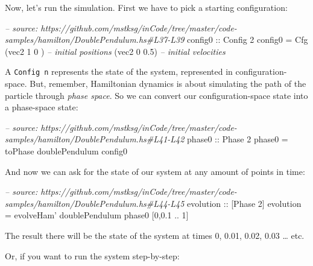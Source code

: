 \documentclass[]{article}
\newenvironment{Shaded}{}{}
\newcommand{\CommentTok}[1]{\textcolor[rgb]{0.38,0.63,0.69}{\textit{#1}}}
\newcommand{\DataTypeTok}[1]{\textcolor[rgb]{0.56,0.13,0.00}{#1}}
\newcommand{\DecValTok}[1]{\textcolor[rgb]{0.25,0.63,0.44}{#1}}
\newcommand{\FloatTok}[1]{\textcolor[rgb]{0.25,0.63,0.44}{#1}}
\newcommand{\FunctionTok}[1]{\textcolor[rgb]{0.02,0.16,0.49}{#1}}
\newcommand{\NormalTok}[1]{#1}
\newcommand{\OtherTok}[1]{\textcolor[rgb]{0.00,0.44,0.13}{#1}}
\begin{document}
Now, let's run the simulation. First we have to pick a starting configuration:

\begin{Shaded}
\begin{Highlighting}[]
\CommentTok{-- source: https://github.com/mstksg/inCode/tree/master/code-samples/hamilton/DoublePendulum.hs#L37-L39}
\OtherTok{config0 ::} \DataTypeTok{Config} \DecValTok{2}
\NormalTok{config0 }\FunctionTok{=} \DataTypeTok{Cfg}\NormalTok{ (vec2 }\DecValTok{1} \DecValTok{0}\NormalTok{  )  }\CommentTok{-- initial positions}
\NormalTok{              (vec2 }\DecValTok{0} \FloatTok{0.5}\NormalTok{)  }\CommentTok{-- initial velocities}
\end{Highlighting}
\end{Shaded}

A \texttt{Config\ n} represents the state of the system, represented in
configuration-space. But, remember, Hamiltonian dynamics is about simulating the
path of the particle through \emph{phase space}. So we can convert our
configuration-space state into a phase-space state:

\begin{Shaded}
\begin{Highlighting}[]
\CommentTok{-- source: https://github.com/mstksg/inCode/tree/master/code-samples/hamilton/DoublePendulum.hs#L41-L42}
\OtherTok{phase0 ::} \DataTypeTok{Phase} \DecValTok{2}
\NormalTok{phase0 }\FunctionTok{=}\NormalTok{ toPhase doublePendulum config0}
\end{Highlighting}
\end{Shaded}

And now we can ask for the state of our system at any amount of points in time:

\begin{Shaded}
\begin{Highlighting}[]
\CommentTok{-- source: https://github.com/mstksg/inCode/tree/master/code-samples/hamilton/DoublePendulum.hs#L44-L45}
\OtherTok{evolution ::}\NormalTok{ [}\DataTypeTok{Phase} \DecValTok{2}\NormalTok{]}
\NormalTok{evolution }\FunctionTok{=}\NormalTok{ evolveHam' doublePendulum phase0 [}\DecValTok{0}\NormalTok{,}\FloatTok{0.1} \FunctionTok{..} \DecValTok{1}\NormalTok{]}
\end{Highlighting}
\end{Shaded}

The result there will be the state of the system at times 0, 0.01, 0.02, 0.03
\ldots{} etc.

Or, if you want to run the system step-by-step:
\end{document}
